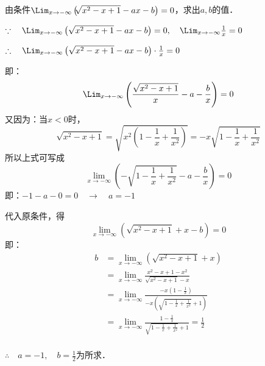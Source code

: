 \begin{example}
由条件$\Lim_{x\to -\infty}\left(\sqrt[]{x^2-x+1}-ax-b\right)=0$，求出$a,b$的值．
\end{example}

\begin{solution}
$\because\quad \Lim_{x\to -\infty}\left(\sqrt{x^2-x+1}-ax-b\right)=0,\quad \Lim_{x\to -\infty}\frac{1}{x}=0$

$\therefore\quad \Lim_{x\to -\infty}\left(\sqrt{x^2-x+1}-ax-b\right)\cdot \frac{1}{x}=0$

即：
\[\Lim_{x\to -\infty}\left(\frac{\sqrt{x^2-x+1}}{x}-a-\frac{b}{x}\right)=0\]
又因为：当$x<0$时，
\[\sqrt{x^2-x+1}=\sqrt{x^2\left(1-\frac{1}{x}+\frac{1}{x^2}\right)}=-x\sqrt{1-\frac{1}{x}+\frac{1}{x^2}}\]
所以上式可写成
\[\lim_{x\to -\infty}\left(-\sqrt{1-\frac{1}{x}+\frac{1}{x^2}}-a-\frac{b}{x}\right)=0\]
即：$-1-a-0=0\quad \to \quad a=-1$

代入原条件，得
\[\lim_{x\to -\infty}\left(\sqrt{x^2-x+1}+x-b\right)=0\]
即：
\[\begin{split}
    b&=\lim_{x\to-\infty}\left(\sqrt{x^2-x+1}+x\right)\\
    &=\lim_{x\to-\infty} \frac{x^2-x+1-x^2}{\sqrt{x^2-x+1}-x}  \\
    &=\lim_{x\to-\infty}\frac{-x\left(1-\frac{1}{x}\right)}{-x\left(\sqrt{1-\frac{1}{x}+\frac{1}{x^2}}+1\right)}    \\
    &=\lim_{x\to-\infty}\frac{1-\frac{1}{x}}{\sqrt{1-\frac{1}{x}+\frac{1}{x^2}}+1} =\frac{1}{2}   \\
\end{split}\]

$\therefore\quad a=-1,\quad b=\frac{1}{2}$为所求．
\end{solution}

